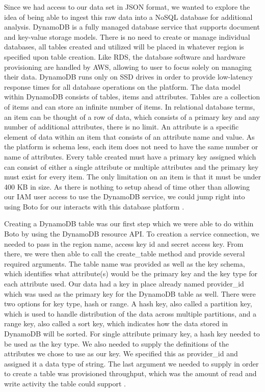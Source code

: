 Since we had access to our data set in JSON format, we wanted to explore the idea of being able to ingest this raw data into a NoSQL database for additional analysis. DynamoDB is a fully managed database service that supports document and key-value storage models. There is no need to create or manage individual databases, all tables created and utilized will be placed in whatever region is specified upon table creation. Like RDS, the database software and hardware provisioning are handled by AWS, allowing to user to focus solely on managing their data. DynamoDB runs only on SSD drives in order to provide low-latency response times for all database operations on the platform. The data model within DynamoDB consists of tables, items and attributes. Tables are a collection of items and can store an infinite number of items. In relational database terms, an item can be thought of a row of data, which consists of a primary key and any number of additional attributes, there is no limit. An attribute is a specific element of data within an item that consists of an attribute name and value. As the platform is schema less, each item does not need to have the same number or name of attributes. Every table created must have a primary key assigned which can consist of either a single attribute or multiple attributes and the primary key must exist for every item. The only limitation on an item is that it must be under 400 KB in size. As there is nothing to setup ahead of time other than allowing our IAM user access to use the DynamoDB service, we could jump right into using Boto for our interacts with this database platform \cite{hid-sp18-521-dynamodbfaq}. 

Creating a DynamoDB table was our first step which we were able to do within Boto by using the DynamoDB resource API. To creation a service connection, we needed to pass in the region name, access key id and secret access key. From there, we were then able to call the create_table method and provide several required arguments. The table name was provided as well as the key schema, which identifies what attribute(s) would be the primary key and the key type for each attribute used. Our data had a key in place already named provider_id which was used as the primary key for the DynamoDB table as well. There were two options for key type, hash or range. A hash key, also called a partition key, which is used to handle distribution of the data across multiple partitions, and a range key, also called a sort key, which indicates how the data stored in DynamoDB will be sorted. For single attribute primary key, a hash key needed to be used as the key type. We also needed to supply the definitions of the attributes we chose to use as our key. We specified this as provider_id and assigned it a data type of string. The last argument we needed to supply in order to create a table was provisioned throughput, which was the amount of read and write activity the table could support \cite{hid-sp18-521-dynamodbfaq}.  

